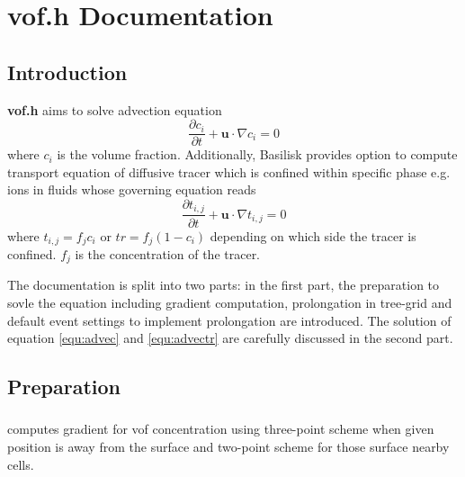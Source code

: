 \chapter{vof.h Documentation}
\ifsingle
\maketitle
\fi
\chaptermeta[1.0][2025-06-07]

\section{Introduction}
\textbf{vof.h} aims to solve advection equation
\begin{equation}\label{equ:advec}
    \frac{\partial c_{i}}{\partial t} + \mathbf{u}\cdot\nabla c_{i} = 0
\end{equation}
where $c_{i}$ is the volume fraction.
Additionally, Basilisk provides option to compute transport equation of diffusive tracer which is confined within specific phase e.g. ions in fluids whose governing equation reads\cite{2015_Lopez}
\begin{equation}\label{equ:advectr}
    \frac{\partial t_{i,j}}{\partial t} + \mathbf{u}\cdot\nabla t_{i,j} = 0
\end{equation}
where $t_{i,j}=f_{j} c_{i}$ or $tr=f_{j} (1-c_{i})$ depending on which side the tracer is confined. $f_{j}$ is the concentration of the tracer.\par
The documentation is split into two parts: in the first part, the preparation to sovle the equation including gradient computation, prolongation in tree-grid and default event settings to implement prolongation are introduced. The solution of equation \ref{equ:advec} and \ref{equ:advectr} are carefully discussed in the second part.

\section{Preparation}
\subsection{}\label{sec:gradient}
 computes gradient for vof concentration using three-point scheme when given position is away from the surface and two-point scheme for those surface nearby cells.
